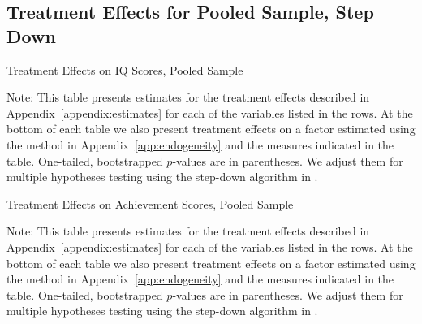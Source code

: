 \subsection{Treatment Effects for Pooled Sample, Step Down}


	\begin{table}[H]
     \caption{Treatment Effects on IQ Scores, Pooled Sample}
     \label{table:abccare_rslt_pooled_cat0_sd}
	
	\end{table} 
\begin{spacing}{1}
\begin{footnotesize}
\noindent Note: This table presents estimates for the treatment effects described in Appendix~\ref{appendix:estimates} for each of the variables listed in the rows. At the bottom of each table we also present treatment effects on a factor estimated using the method in Appendix~\ref{app:endogeneity} and the measures indicated in the table. One-tailed, bootstrapped $p$-values are in parentheses. We adjust them for multiple hypotheses testing using the step-down algorithm in \citet{Romano_Wolf_2016_pval_SaPL}. 
\end{footnotesize}
\end{spacing}

	\begin{table}[H]
     \caption{Treatment Effects on Achievement Scores, Pooled Sample}
     \label{table:abccare_rslt_pooled_cat1_sd}
	
	\end{table} 
\begin{spacing}{1}
\begin{footnotesize}
\noindent Note: This table presents estimates for the treatment effects described in Appendix~\ref{appendix:estimates} for each of the variables listed in the rows. At the bottom of each table we also present treatment effects on a factor estimated using the method in Appendix~\ref{app:endogeneity} and the measures indicated in the table. One-tailed, bootstrapped $p$-values are in parentheses. We adjust them for multiple hypotheses testing using the step-down algorithm in \citet{Romano_Wolf_2016_pval_SaPL}. 
\end{footnotesize}
\end{spacing}

